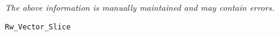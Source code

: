 \label{pkg:rw\_vector\_slice}

{\tiny \it The above information is manually maintained and may contain errors.}
\begin{verbatim}
Rw_Vector_Slice
\end{verbatim}
